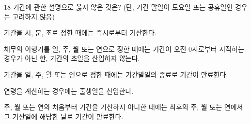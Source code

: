 \begin{question}{18}
기간에 관한 설명으로 옳지 않은 것은? (단, 기간 말일이 토요일 또는 공휴일인 경우는 고려하지 않음)
\begin{choices}
  \item 기간을 시, 분, 초로 정한 때에는 즉시로부터 기산한다.
  \item 채무의 이행기를 일, 주, 월 또는 연으로 정한 때에는 기간이 오전 0시로부터 시작하는 경우가 아닌 한, 기간의 초일을 산입하지 않는다.
  \item 기간을 일, 주, 월 또는 연으로 정한 때에는 기간말일의 종료로 기간이 만료한다.
  \item 연령을 계산하는 경우에는 출생일을 산입한다.
  \item 주, 월 또는 연의 처음부터 기간을 기산하지 아니한 때에는 최후의 주, 월 또는 연에서 그 기산일에 해당한 날로 기간이 만료한다.
\end{choices}
\end{question}
